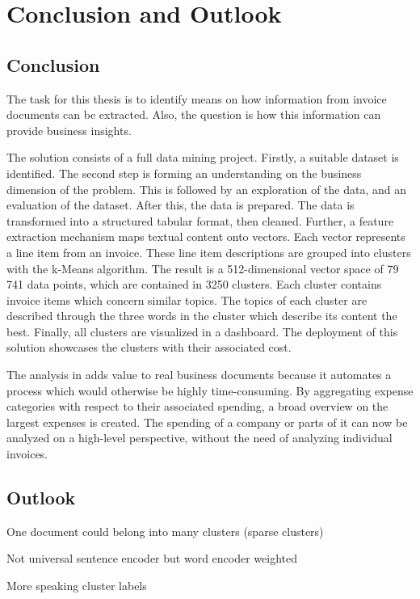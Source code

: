 \chapter{Conclusion and Outlook}
\section{Conclusion}

The task for this thesis is to identify means on how information from invoice documents can be extracted. Also, the question is how this information can provide business insights.

The solution consists of a full data mining project. Firstly, a suitable dataset is identified. The second step is forming an understanding on the business dimension of the problem. This is followed by an exploration of the data, and an evaluation of the dataset. After this, the data is prepared. The data is transformed into a structured tabular format, then cleaned. Further, a feature extraction mechanism maps textual content onto vectors. Each vector represents a line item from an invoice. These line item descriptions are grouped into clusters with the k-Means algorithm. The result is a 512-dimensional vector space of 79 741 data points, which are contained in 3250 clusters. Each cluster contains invoice items which concern similar topics. The topics of each cluster are described through the three words in the cluster which describe its content the best. Finally, all clusters are visualized in a dashboard. The deployment of this solution showcases the clusters with their associated cost. 

The analysis in adds value to real business documents because it automates a process which would otherwise be highly time-consuming. By aggregating expense categories with respect to their associated spending, a broad overview on the largest expenses is created. The spending of a company or parts of it can now be analyzed on a high-level perspective, without the need of analyzing individual invoices.

\section{Outlook}

One document could belong into many clusters (sparse clusters)

Not universal sentence encoder but word encoder weighted

More speaking cluster labels




